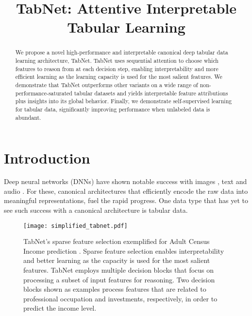 \title{TabNet: Attentive Interpretable Tabular Learning}



\maketitle

\begin{abstract}

We propose a novel high-performance and interpretable canonical deep tabular data learning architecture, TabNet. 
TabNet uses sequential attention to choose which features to reason from at each decision step, enabling interpretability and more efficient learning as the learning capacity is used for the most salient features.
We demonstrate that TabNet outperforms other variants on a wide range of non-performance-saturated tabular datasets and yields interpretable feature attributions plus insights into its global behavior. 
Finally, we demonstrate self-supervised learning for tabular data, significantly improving performance when unlabeled data is abundant.

\end{abstract}

\section{Introduction}
Deep neural networks (DNNs) have shown notable success with images \citep{resnet}, text \citep{rcnn_text} and audio \citep{deepspeech2}. 
For these, canonical architectures that efficiently encode the raw data into meaningful representations, fuel the rapid progress.
One data type that has yet to see such success with a canonical architecture is tabular data. 

\begin{figure*}[!h]
\centering
\texttt{[image: simplified\_tabnet.pdf]}
\caption{TabNet's sparse feature selection exemplified for Adult Census Income prediction \citep{UCI}. 
Sparse feature selection enables interpretability and better learning as the capacity is used for the most salient features.
TabNet employs multiple decision blocks that focus on processing a subset of input features for reasoning. 
Two decision blocks shown as examples process features that are related to professional occupation and investments, respectively, in order to predict the income level. 
}
\label{fig:simplified_tabnet}
\end{figure*}

